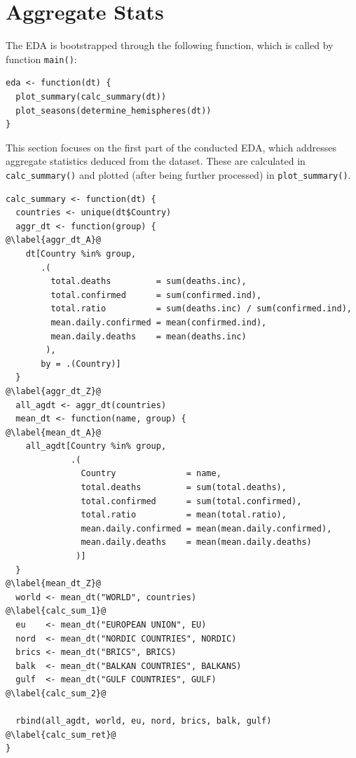 \section{Aggregate Stats}

The EDA is bootstrapped through the following function, which is called by function \texttt{main()}:

\begin{verbatim}
eda <- function(dt) {
  plot_summary(calc_summary(dt))
  plot_seasons(determine_hemispheres(dt))
}
\end{verbatim}

This section focuses on the first part of the conducted EDA, which addresses aggregate statistics deduced from the dataset.
These are calculated in \texttt{calc\_summary()} and plotted (after being further processed) in \texttt{plot\_summary()}.

\begin{verbatim}
calc_summary <- function(dt) {
  countries <- unique(dt$Country)
  aggr_dt <- function(group) {                                    @\label{aggr_dt_A}@
    dt[Country %in% group,
       .(
         total.deaths         = sum(deaths.inc),
         total.confirmed      = sum(confirmed.ind),
         total.ratio          = sum(deaths.inc) / sum(confirmed.ind),
         mean.daily.confirmed = mean(confirmed.ind),
         mean.daily.deaths    = mean(deaths.inc)
        ),
       by = .(Country)]
  }                                                               @\label{aggr_dt_Z}@
  all_agdt <- aggr_dt(countries)
  mean_dt <- function(name, group) {                              @\label{mean_dt_A}@
    all_agdt[Country %in% group,
             .(
               Country              = name,
               total.deaths         = sum(total.deaths),
               total.confirmed      = sum(total.confirmed),
               total.ratio          = mean(total.ratio),
               mean.daily.confirmed = mean(mean.daily.confirmed),
               mean.daily.deaths    = mean(mean.daily.deaths)
              )]
  }                                                               @\label{mean_dt_Z}@
  world <- mean_dt("WORLD", countries)                            @\label{calc_sum_1}@
  eu    <- mean_dt("EUROPEAN UNION", EU)
  nord  <- mean_dt("NORDIC COUNTRIES", NORDIC)
  brics <- mean_dt("BRICS", BRICS)
  balk  <- mean_dt("BALKAN COUNTRIES", BALKANS)
  gulf  <- mean_dt("GULF COUNTRIES", GULF)                        @\label{calc_sum_2}@

  rbind(all_agdt, world, eu, nord, brics, balk, gulf)             @\label{calc_sum_ret}@
}
\end{verbatim}

